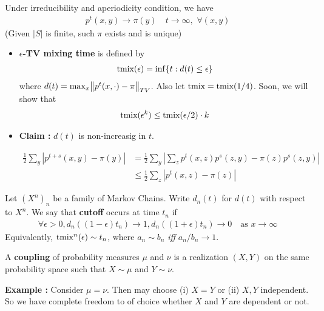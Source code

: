 \documentclass[12pt,a4paper]{article}
\newenvironment{proof}
{\begin{changemargin}{1cm}{0.5cm} 
	}%
	{\end{changemargin}
}
\begin{document}
Under irreducibility and aperiodicity condition, we have
\begin{align*}
p^t(x,y) \rightarrow \pi (y) \quad t\rightarrow \infty, \,\, \forall (x,y)
\end{align*}
(Given $|S|$ is finite, such $\pi$ exists and is unique)
\s

\begin{itemize}
\item \textbf{$\epsilon$-TV mixing time} is defined by
\begin{align*}
\text{tmix} (\epsilon) = \inf \{t: d(t) \leq \epsilon \}
\end{align*}
where $d(t) = \max_x \bigl\lVert p^t(x, \cdot)- \pi\bigr\rVert_{TV}$. Also let $\text{tmix} = \text{tmix} (1/4)$. Soon, we will show that
\begin{align*}
\text{tmix} (\epsilon^k) \leq \text{tmix} (\epsilon/2)\cdot k
\end{align*}
\item \textbf{Claim :} $d(t)$ is non-increasig in $t$.
\begin{proof}
\pf \begin{align*}
\frac{1}{2} \sum_y |p^{t+s}(x,y) - \pi(y)| &= \frac{1}{2} \sum_y |\sum_z p^t(x,z) p^s (z,y) - \pi (z) p^s (z,y)| \\
&\leq \frac{1}{2} \sum_z |p^t(x,z) - \pi(z)|
\end{align*}
\end{proof}
\end{itemize}
\s

 Let $(X^n)_n$ be a family of Markov Chains. Write $d_n(t)$ for $d(t)$ with respect to $X^n$. We say that \textbf{cutoff} occurs at time $t_n$ if
\begin{align*}
\forall \epsilon>0, d_n((1-\epsilon)t_n) \rightarrow 1, d_n((1+\epsilon)t_n) \rightarrow 0 \quad \text{as } x\rightarrow \infty
\end{align*}
Equivalently, $\text{tmix}^n (\epsilon) \sim t_n$, where $a_n \sim b_n$ \emph{iff}  $a_n/b_n \rightarrow 1$.
\s

 A \textbf{coupling} of probability measures $\mu$ and $\nu$ is a realization $(X,Y)$ on the same probability space such that $X\sim \mu$ and $Y\sim \nu$.
\s

\textbf{Example : } Consider $\mu = \nu$. Then may choose (i) $X=Y$ or (ii) $X,Y$ independent. So we have complete freedom to of choice whether $X$ and $Y$ are dependent or not.
\s
\end{document}

